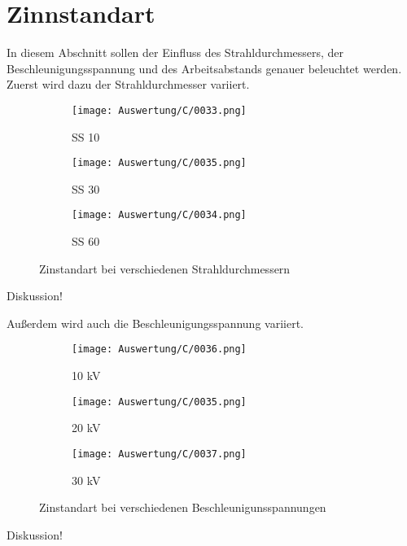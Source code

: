 \newpage
\section{Zinnstandart}
In diesem Abschnitt sollen der Einfluss des Strahldurchmessers, der Beschleunigungsspannung und des Arbeitsabstands genauer beleuchtet werden. \\

Zuerst wird dazu der Strahldurchmesser variiert.
\begin{figure}[h]
    \centering
    \begin{subfigure}[b]{0.25\textwidth}
        \centering
        \texttt{[image: Auswertung/C/0033.png]}
        \caption{SS 10}
    \end{subfigure}
    \hfill
    \begin{subfigure}[b]{0.25\textwidth}
        \centering
        \texttt{[image: Auswertung/C/0035.png]}
        \caption{SS 30}
    \end{subfigure}
    \hfill
    \begin{subfigure}[b]{0.25\textwidth}
        \centering
        \texttt{[image: Auswertung/C/0034.png]}
        \caption{SS 60}
    \end{subfigure}
    \caption{Zinstandart bei verschiedenen Strahldurchmessern}
\end{figure}

Diskussion!

Außerdem wird auch die Beschleunigungsspannung variiert.
\begin{figure}[h]
    \centering
    \begin{subfigure}[b]{0.25\textwidth}
        \centering
        \texttt{[image: Auswertung/C/0036.png]}
        \caption{10 kV}
    \end{subfigure}
    \hfill
    \begin{subfigure}[b]{0.25\textwidth}
        \centering
        \texttt{[image: Auswertung/C/0035.png]}
        \caption{20 kV}
    \end{subfigure}
    \hfill
    \begin{subfigure}[b]{0.25\textwidth}
        \centering
        \texttt{[image: Auswertung/C/0037.png]}
        \caption{30 kV}
    \end{subfigure}
    \caption{Zinstandart bei verschiedenen Beschleunigunsspannungen}
\end{figure}

Diskussion!

